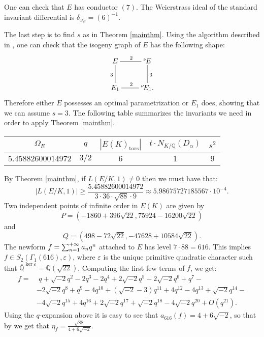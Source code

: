 \documentclass[11pt]{amsart}
\theoremstyle{definition}
\begin{document}
		One can check that $E$ has conductor $(7)$. The Weierstrass ideal of the standard invariant differential is $\delta_{\omega_E}=(6)^{-1}$.

		The last step is to find $s$ as in Theorem \ref{mainthm}. Using the algorithm described in \cite{bil}, one can check that the isogeny graph of $E$ has the following shape:
		$$\begin{xymatrix}{
				   E\ar@{-}[r]^{2}\ar@{-}[d]_{3} & {{}^\nu\!} E \ar@{-}[d]^{3}\\
					E_1 \ar@{-}[r]^2 & {{}^\nu\!} E_1.
			  }\end{xymatrix}$$
		Therefore either $E$ possesses an optimal parametrization or $E_1$ does, showing that we can assume $s=3$. The following table summarizes the invariants we need in order to apply Theorem \ref{mainthm}.
			\begin{center}
				\begin{tabular}{| c | c | c | c | c |}
			    \hline
				$\Omega_E$ & $q$ & $|E(K)_{\text{tors}}|$ & $t\cdot N_{K/{\mathbb{Q}}}(D_{\alpha})$ & $s^2$ \\ \hline\hline
			    $5.45882600014972$ & $3/2$ & $6$ & $1$ & $9$\\ \hline
			  \end{tabular}
		\end{center}
		By Theorem \ref{mainthm}, if $L(E/K,1)\neq 0$ then we must have that:
		$$|L(E/K,1)|\geq\frac{5.45882600014972}{3\cdot 36\cdot\sqrt{88}\cdot 9}\approx 5.98675727185567\cdot 10^{-4}.$$
		Two independent points of infinite order in $E(K)$ are given by 
		$$P=(-1860 +396 \sqrt{22}, 75924-16200 \sqrt{22})$$
		and
		$$Q=(498-72 \sqrt{22},-47628+10584\sqrt{22}).$$
		The newform ${\displaystyle} f=\sum_{n=1}^{+\infty}a_nq^n$ attached to $E$ has level $7\cdot 88=616$. This implies $f\in S_2(\Gamma_1(616),\varepsilon)$, where $\varepsilon$ is the unique primitive quadratic character such that ${\overline{\mathbb{Q}}}^{\ker\varepsilon}={\mathbb{Q}}(\sqrt{22})$. Computing the first few terms of $f$, we get:
		\begin{equation*}\begin{split}
		f = & \,\, q + \sqrt{-2}q^2 - 2q^3 - 2q^4 + 2\sqrt{-2}q^5 - 2\sqrt{-2}q^6 + q^7-\\
		& - 2\sqrt{-2}q^8 + q^9 - 4q^{10} +(\sqrt{-2} - 3)q^{11} + 4q^{12} - 4q^{13} + \sqrt{-2}q^{14}-\\
		& - 4\sqrt{-2}q^{15} + 4q^{16} + 2\sqrt{-2}q^{17} + \sqrt{-2}q^{18} - 4\sqrt{-2}q^{20} + O(q^{21}).
		\end{split}\end{equation*}
		Using the $q$-expansion above it is easy to see that $a_{616}(f)=4+6\sqrt{-2}$, so that by \cite[Theorem 2.1]{atkli} we get that $\displaystyle\eta_f=\frac{\sqrt{88}}{4+6\sqrt{-2}}$.
\end{document}
